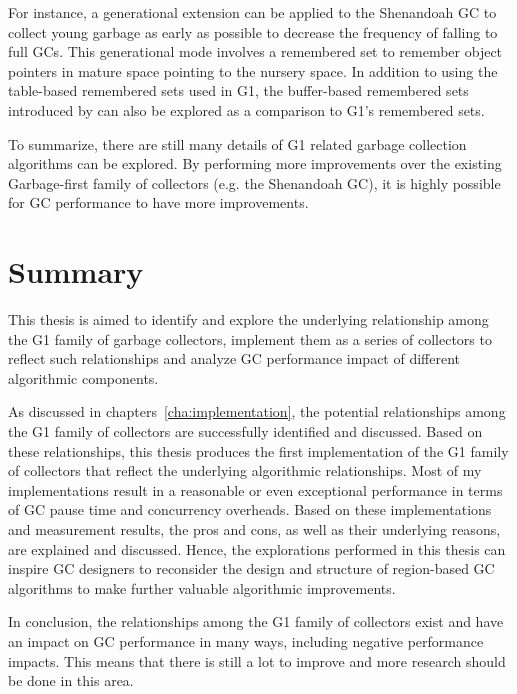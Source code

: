 For instance, a generational extension can be applied to the Shenandoah GC to collect
young garbage as early as possible to decrease the frequency of falling to full GCs.
This generational mode involves a remembered set to remember object pointers in mature
space pointing to the nursery space. In addition to using the table-based remembered
sets used in G1, the buffer-based remembered sets introduced by \cite{blackburn2008immix} can
also be explored as a comparison to G1's remembered sets.

To summarize, there are still many details of G1 related garbage collection algorithms can be
explored. By performing more improvements over the existing Garbage-first family of collectors
(e.g. the Shenandoah GC), it is highly possible for GC performance to have more improvements.

\section{Summary}

This thesis is aimed to identify and explore the underlying relationship among the
G1 family of garbage collectors, implement them as a series of collectors to
reflect such relationships and analyze GC performance impact of different algorithmic components.

As discussed in chapters~\ref{cha:implementation}, the potential relationships among the G1 family of collectors
are successfully identified and discussed.
Based on these relationships, this thesis produces the first implementation of the
G1 family of collectors that reflect the underlying algorithmic relationships.
Most of my implementations result in a reasonable
or even exceptional performance in terms of GC pause time and concurrency overheads.
Based on these implementations and measurement results, the pros and cons, as well
as their underlying reasons, are explained and discussed.
Hence, the explorations performed in this thesis can inspire GC designers to
reconsider the design and structure of region-based GC algorithms to make
further valuable algorithmic improvements.

In conclusion, the relationships among the G1 family of collectors exist and have
an impact on GC performance in many ways, including negative performance impacts.
This means that there is still a lot to improve and more research should be done in this area.





